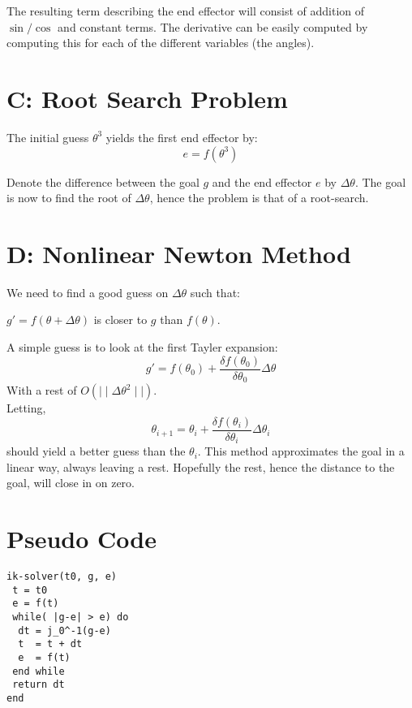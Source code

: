 \documentclass[10pt,oneside,a4paper,final,english]{memoir}
\begin{document}
The resulting term describing the end effector will consist of
addition of $\sin/\cos$ and constant terms. The derivative can be
easily computed by computing this for each of the different variables
(the angles).

\section*{C: Root Search Problem}
The initial guess $\theta^3$ yields the first end effector by:
\[ e = f(\theta^3) \]

Denote the difference between the goal $g$ and the end effector $e$ by
$\Delta\theta$. The goal is now to find the root of $\Delta\theta$,
hence the problem is that of a root-search.


\section*{D: Nonlinear Newton Method}
We need to find a good guess on $\Delta\theta$ such that:
\begin{center}
$g' = f(\theta + \Delta\theta)$ is closer to $g$ than $f(\theta)$.
\end{center}

A simple guess is to look at the first Tayler expansion:
\[ g' = f(\theta_0) + \frac{\delta
  f(\theta_0)}{\delta\theta_0}\Delta\theta \]
With a rest of $O(\mid\mid \Delta\theta^2\mid\mid)$. \\

Letting,
\[\theta_{i+1} = \theta_i +
\frac{\delta f(\theta_i)}{\delta\theta_i}\Delta\theta_i \]
should yield a better guess than the $\theta_i$. This method
approximates the goal in a linear way, always leaving a
rest. Hopefully the rest, hence the distance to the goal, will close
in on zero.




\section*{Pseudo Code}
\begin{verbatim}
ik-solver(t0, g, e)
 t = t0
 e = f(t)
 while( |g-e| > e) do
  dt = j_0^-1(g-e)
  t  = t + dt
  e  = f(t)
 end while
 return dt
end
\end{verbatim}
\end{document}
